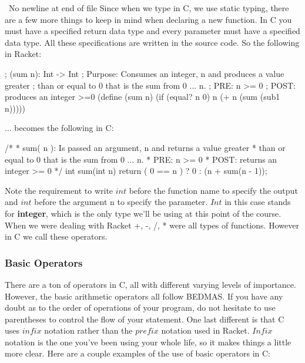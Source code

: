   
\ No newline at end of file
Since when we type in C, we use static typing, there are a few more things to keep in mind when declaring a new function.  In C you must have a specified return data type and every parameter must have a specified data type.  All these specifications are written in the source code.  So the following in Racket: \\

\begin{code}[Lisp]
; (sum n): Int -> Int
;	Purpose: Consumes an integer, n and produces a value greater
;	         than or equal to 0 that is the sum from 0 ... n.
; PRE: n >= 0
; POST: produces an integer >=0
(define (sum n)
	(if (equal? n 0) n (+ n (sum (sub1 n)))))
\end{code}

... becomes the following in C:\\

\begin{code}[C]
/*
 * sum( n ): Is passed an argument, n and returns a value greater
 *           than or equal to 0 that is the sum from 0 ... n.
 * PRE: n >= 0
 * POST: returns an integer >= 0
 */
int sum(int n) 
{
	return ( 0 == n ) ? 0 : (n + sum(n - 1));
}
\end{code}

Note the requirement to write $int$ before the function name to specify the output and $int$ before the argument n to specify the parameter.  $Int$ in this case stands for \textbf{integer}, which is the only type we'll be using at this point of the course.\\

When we were dealing with Racket +, -, /, * were all types of functions.  However in C we call these operators.

\subsubsection*{Basic Operators}

There are a ton of operators in C, all with different varying levels of importance.  However, the basic arithmetic operators all follow BEDMAS.  If you have any doubt as to the order of operations of your program, do not hesitate to use parentheses to control the flow of your statement.  One last different is that C uses $infix$ notation rather than the $prefix$ notation used in Racket.  $Infix$ notation is the one you've been using your whole life, so it makes things a little more clear.  Here are a couple examples of the use of basic operators in C:\\

